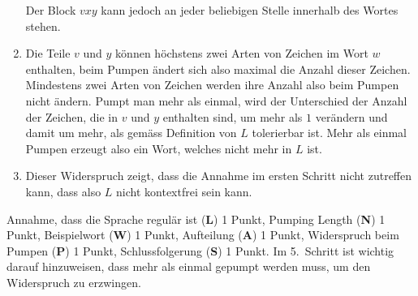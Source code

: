\begin{loesung}
\begin{enumerate}
\begin{center}
\end{center}
Der Block $vxy$ kann jedoch an jeder beliebigen Stelle innerhalb des
Wortes stehen.
\item
Die Teile $v$ und $y$ können höchstens zwei Arten von Zeichen im Wort $w$
enthalten, beim Pumpen ändert sich also maximal die Anzahl dieser
Zeichen.
Mindestens zwei Arten von Zeichen werden ihre Anzahl also beim Pumpen
nicht ändern.
Pumpt man mehr als einmal, wird der Unterschied der Anzahl der Zeichen,
die in $v$ und $y$ enthalten sind, um mehr als $1$ verändern und damit
um mehr, als gemäss Definition von $L$ tolerierbar ist.
Mehr als einmal Pumpen erzeugt also ein Wort, welches nicht mehr in
$L$ ist.
\item
Dieser Widerspruch zeigt, dass die Annahme im ersten Schritt nicht
zutreffen kann, dass also $L$ nicht kontextfrei sein kann.
\qedhere
\end{enumerate}
\end{loesung}

\begin{bewertung}
Annahme, dass die Sprache regulär ist ({\bf L}) 1 Punkt,
Pumping Length ({\bf N}) 1 Punkt,
Beispielwort ({\bf W}) 1 Punkt,
Aufteilung ({\bf A}) 1 Punkt,
Widerspruch beim Pumpen ({\bf P}) 1 Punkt,
Schlussfolgerung ({\bf S}) 1 Punkt.
Im 5.~Schritt ist wichtig darauf hinzuweisen,
dass mehr als einmal gepumpt werden muss, um den Widerspruch zu erzwingen.
\end{bewertung}


